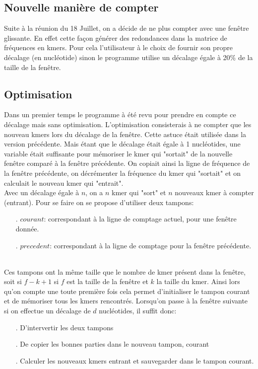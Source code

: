 \subsection{Nouvelle manière de compter}
Suite à la réunion du 18 Juillet, on a décide de ne plus compter avec une fenêtre glissante. En effet cette façon générer des redondances dans la matrice de fréquences en kmers. Pour 
cela l'utilisateur à le choix de fournir son propre décalage (en nucléotide) sinon le programme utilise un décalage égale à 20\% de la taille de la fenêtre.

\subsection{Optimisation}
Dans un premier temps le programme à été revu pour prendre en compte ce décalage mais sans optimisation. L'optimisation consisterais à ne compter que les nouveau kmers lors du décalage de la fenêtre. Cette astuce était utilisée dans la version précédente. Mais étant que le décalage était égale à 1 nucléotides, une variable était suffisante pour mémoriser le kmer qui "sortait" de la nouvelle fenêtre comparé à la fenêtre précédente. On copiait ainsi la ligne de fréquence de la fenêtre précédente, on décrémenter la fréquence du kmer qui "sortait" et on calculait le nouveau kmer qui "entrait".
\\

Avec un décalage égale à $n$, on a $n$ kmer qui "sort" et $n$ nouveaux kmer à compter (entrant). Pour se faire on se propose d'utiliser deux tampons: 
\begin{itemize}
 \item[.] $courant$: correspondant à la ligne de comptage actuel, pour une fenêtre donnée.
 \item[.] $precedent$: correspondant à la ligne de comptage pour la fenêtre précédente.
\end{itemize}
~\\

Ces tampons ont la même taille que le nombre de kmer présent dans la fenêtre, soit si $f-k+1$ si $f$ est la taille de la fenêtre et $k$ la taille du kmer. Ainsi lors qu'on compte une toute première fois cela permet d'initialiser le tampon courant et de mémoriser tous les kmers rencontrés. Lorsqu'on passe à la fenêtre suivante si on effectue un décalage de $d$ nucléotides, il suffit donc:
\begin{itemize}
 \item[.] D'intervertir les deux tampons
 \item[.] De copier les bonnes parties dans le nouveau tampon, courant
 \item[.] Calculer les nouveaux kmers entrant et sauvegarder dans le tampon courant.
\end{itemize}
~\\

